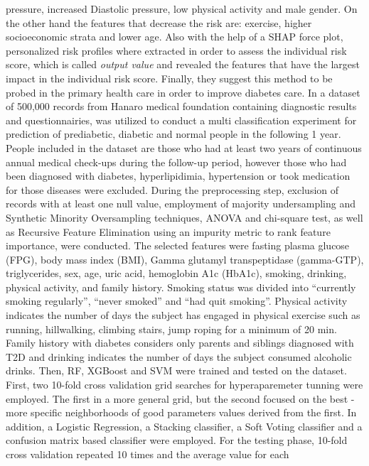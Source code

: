 \documentclass[journal,article,submit,pdftex,moreauthors]{Definitions/mdpi}
\begin{document}
pressure, increased Diastolic pressure, low physical activity and male gender. On the other
hand the features that decrease the risk are: exercise, higher socioeconomic strata and lower
age. Also with the help of a SHAP force plot, personalized risk profiles where extracted in order
to assess the individual risk score, which is called \textit{output value} and  revealed 
the features that have the largest impact in the individual risk score. Finally, they suggest 
this method to be probed in the primary health care in order to improve diabetes care.
In \cite{ijerph18063317} a dataset of 500,000 records from Hanaro medical foundation containing 
diagnostic results and questionnairies, was utilized to conduct a multi classification 
experiment for prediction of prediabetic,  diabetic and normal people in the following 1 year. 
People included in the dataset are those who had at least two years of continuous annual medical
check-ups during the follow-up period, however those who had been diagnosed with diabetes, 
hyperlipidimia, hypertension or took medication for those diseases were excluded. During the 
preprocessing step, exclusion of records with at least one null value, employment of majority 
undersampling and Synthetic Minority Oversampling techniques, ANOVA and  chi-square test, as well as
Recursive Feature Elimination using an impurity metric to rank feature importance, were conducted.
The selected features were fasting plasma glucose (FPG), body mass index (BMI), Gamma
glutamyl transpeptidase (gamma-GTP), triglycerides, sex, age, uric acid, hemoglobin A1c
(HbA1c), smoking, drinking, physical activity, and family history. Smoking status was
divided into “currently smoking regularly”, “never smoked” and “had quit smoking”.
Physical activity indicates the number of days the subject has engaged in physical exercise
such as running, hillwalking, climbing stairs, jump roping for a minimum of 20 min. Family
history with diabetes considers only parents and siblings diagnosed with T2D and drinking
indicates the number of days the subject consumed alcoholic drinks. Then, RF, XGBoost and SVM were
trained and tested on the dataset. First, two 10-fold cross validation grid searches for 
hyperaparemeter tunning were employed. The first in a more general grid, but the second focused 
on the best - more specific neighborhoods of good parameters values derived from the first.
In addition, a Logistic Regression, a Stacking classifier, a Soft Voting
classifier and a confusion matrix based classifier were employed. For the testing
phase, 10-fold cross validation repeated 10 times and the average value for each
\end{document}
